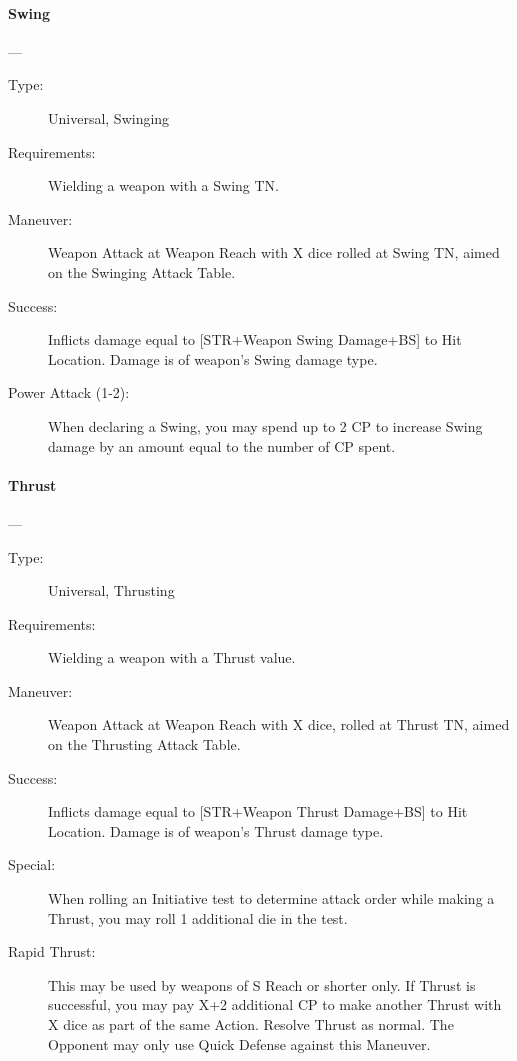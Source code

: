 \documentclass[oneside,11pt,english]{book}
\begin{document}
\paragraph{\large\label{man:Swing}Swing}---\quad{\large[X]}
\vspace{-10pt}\begin{description} 
\item [Type:] Universal, Swinging 
\item [Requirements:] Wielding a weapon with a Swing TN. 
\item [Maneuver:] Weapon Attack at Weapon Reach with X dice rolled at Swing TN, aimed on the Swinging 
Attack Table. 
\item [Success:] Inflicts damage equal to [STR+Weapon Swing Damage+BS] to Hit Location. Damage is of 
weapon’s Swing damage type. 
\item [Power Attack (1-2):] When declaring a Swing, you may spend up to 2 CP to increase Swing damage by 
an amount equal to the number of CP spent. 
\end{description}
\paragraph{\large\label{man:Thrust}Thrust}---\quad{\large[X]}
\vspace{-10pt}\begin{description} 
\item [Type:] Universal, Thrusting 
\item [Requirements:] Wielding a weapon with a Thrust value. 
\item [Maneuver:] Weapon Attack at Weapon Reach with X dice, rolled at Thrust TN, aimed on the Thrusting 
Attack Table. 
\item [Success:] Inflicts damage equal to [STR+Weapon Thrust Damage+BS] to Hit Location. Damage is of 
weapon’s Thrust damage type. 
\item [Special:] When rolling an Initiative test to determine attack order while making a Thrust, you may roll 1 
additional die in the test. 
\item [Rapid Thrust:] This may be used by weapons of S Reach or shorter only. If Thrust is successful, you may 
pay X+2 additional CP to make another Thrust with X dice as part of the same Action. Resolve Thrust as 
normal. The Opponent may only use Quick Defense against this Maneuver. 
\end{description}
\end{document}
